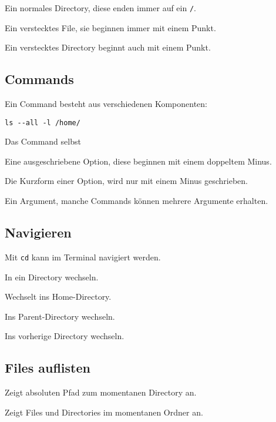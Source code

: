 \documentclass{article}
\begin{document}
Ein normales Directory, diese enden immer auf ein \texttt{/}.

Ein verstecktes File, sie beginnen immer mit einem Punkt.

Ein verstecktes Directory beginnt auch mit einem Punkt.

\subsection{Commands}
Ein Command besteht aus verschiedenen Komponenten:

\begin{verbatim}
ls --all -l /home/
\end{verbatim}

 Das Command selbst

Eine ausgeschriebene Option, diese beginnen mit einem doppeltem Minus.

Die Kurzform einer Option, wird nur mit einem Minus geschrieben.

Ein Argument, manche Commands können mehrere Argumente erhalten.

\subsection{Navigieren}
Mit \texttt{cd} kann im Terminal navigiert werden.

In ein Directory wechseln.

Wechselt ins Home-Directory.

Ins Parent-Directory wechseln.

Ins vorherige Directory wechseln.

\subsection{Files auflisten}
Zeigt absoluten Pfad zum momentanen Directory an.

Zeigt Files und Directories im momentanen Ordner an.
\end{document}
